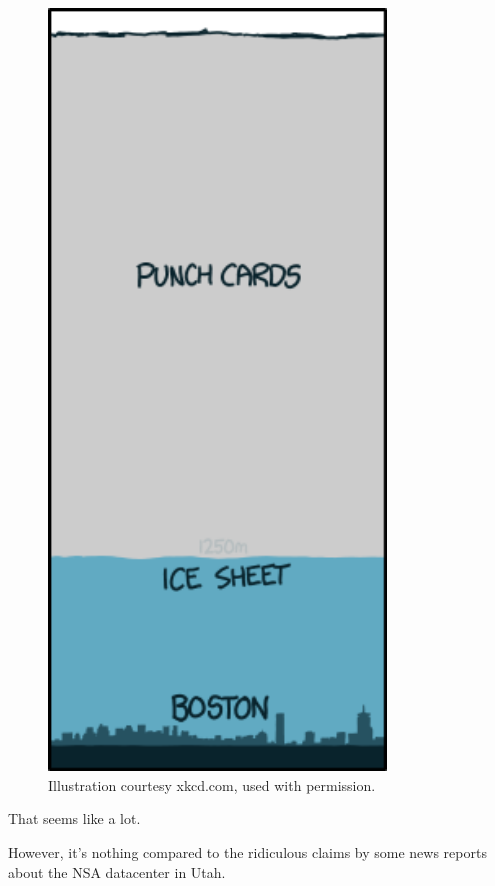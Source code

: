 {\begin{figure}[!htbp]
\centering
\includegraphics[scale=0.5, max width=0.8\textwidth]{imgs/a/63/google_ice.png}
\caption{Illustration courtesy xkcd.com, used with permission.}
\end{figure}

{That seems like a lot.}

{However, it's nothing compared to the ridiculous claims by some news reports about the NSA datacenter in Utah.}

}
